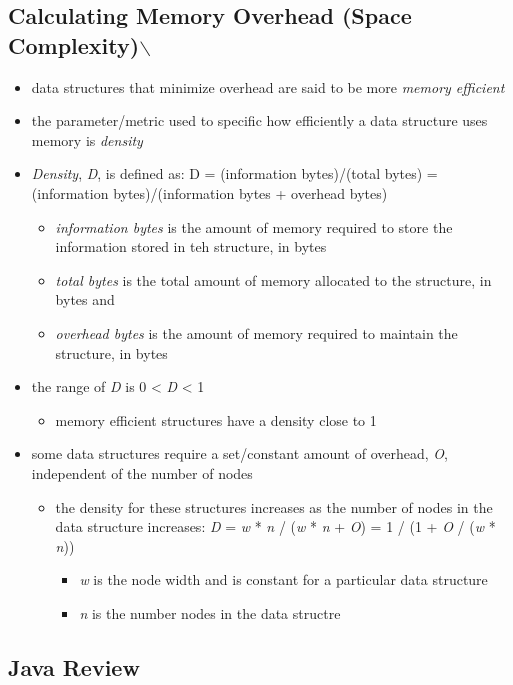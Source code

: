 \documentclass[11pt]{article}
\begin{document}
\subsection{Calculating Memory Overhead (Space Complexity)$\backslash$}
\label{sec:orge949c91}
\begin{itemize}
\item data structures that minimize overhead are said to be more \emph{memory efficient}
\item the parameter/metric used to specific how efficiently a data structure uses memory is \emph{density}
\item \emph{Density}, \emph{D}, is defined as:
D = (information bytes)/(total bytes) = (information bytes)/(information bytes + overhead bytes)
\begin{itemize}
\item \emph{information bytes} is the amount of memory required to store the information stored in teh structure, in bytes
\item \emph{total bytes} is the total amount of memory allocated to the structure, in bytes
and
\item \emph{overhead bytes} is the amount of memory required to maintain the structure, in bytes
\end{itemize}
\item the range of \emph{D} is 0 < \emph{D} < 1
\begin{itemize}
\item memory efficient structures have a density close to 1
\end{itemize}
\item some data structures require a set/constant amount of overhead, \emph{O}, independent of the number of nodes
\begin{itemize}
\item the density for these structures increases as the number of nodes in the data structure increases:
\emph{D} = \emph{w} * \emph{n} / (\emph{w} * \emph{n} + \emph{O}) = 1 / (1 + \emph{O} / (\emph{w} * \emph{n}))
\begin{itemize}
\item \emph{w} is the node width and is constant for a particular data structure
\item \emph{n} is the number nodes in the data structre
\end{itemize}
\end{itemize}
\end{itemize}

\subsection{Java Review}
\label{sec:org99aa8b5}
\end{document}
